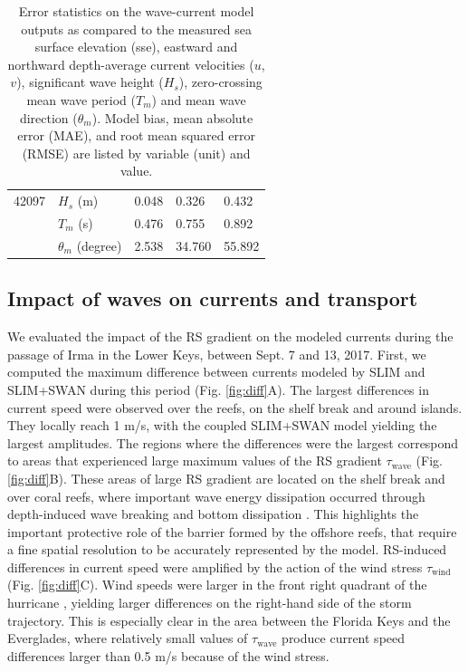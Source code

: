 \begin{table}
\begin{tabular}{|p{2.8cm}p{3cm}p{1.8cm}p{1.8cm}p{1.8cm}|}
        42097 & $H_s$ (m)           &  0.048 &  0.326 &  0.432 \\
              & $T_m$ (s)           &  0.476 &  0.755 &  0.892 \\
              & $\theta_m$ (degree) &  2.538 & 34.760 & 55.892 \\
        \hline
    \end{tabular}
    \caption{Error statistics on the wave-current model outputs as compared to the measured sea surface elevation (sse), eastward and northward depth-average current velocities ($u$,$v$), significant wave height ($H_s$), zero-crossing mean wave period ($T_m$) and mean wave direction ($\theta_m$). Model bias, mean absolute error (MAE), and root mean squared error (RMSE) are listed by variable (unit) and value.}
    \label{tab:stat}
\end{table}

\subsection{Impact of waves on currents and transport}

We evaluated the impact of the RS gradient on the modeled currents during the passage of Irma in the Lower Keys, between Sept. 7 and 13, 2017. First, we computed the maximum difference between currents modeled by SLIM and SLIM+SWAN during this period (Fig. \ref{fig:diff}A). The largest differences in current speed were observed over the reefs, on the shelf break and around islands. They locally reach 1 m/s, with the coupled SLIM+SWAN model yielding the largest amplitudes. The regions where the differences were the largest correspond to areas that experienced large maximum values of the RS gradient {\boldmath$\tau$}$_\text{wave}$ (Fig. \ref{fig:diff}B). These areas of large RS gradient are located on the shelf break and over coral reefs, where important wave energy dissipation occurred through depth-induced wave breaking and bottom dissipation \citep{longuet1964radiation}. This highlights the important protective role of the barrier formed by the offshore reefs, that require a fine spatial resolution to be accurately represented by the model. RS-induced differences in current speed were amplified by the action of the wind stress {\boldmath$\tau$}$_\text{wind}$ (Fig. \ref{fig:diff}C). Wind speeds were larger in the front right quadrant of the hurricane \citep{zedler2009ocean}, yielding larger differences on the right-hand side of the storm trajectory. This is especially clear in the area between the Florida Keys and the Everglades, where relatively small values of {\boldmath$\tau$}$_\text{wave}$ produce current speed differences larger than 0.5 m/s because of the wind stress.

